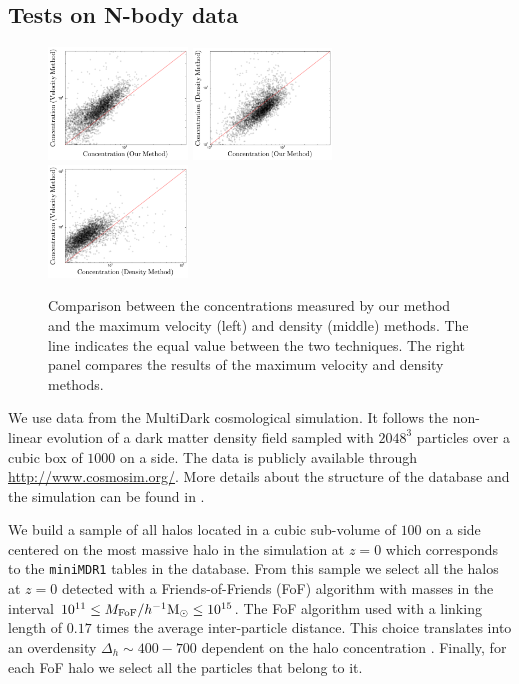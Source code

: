 \documentclass{emulateapj}
\newcommand{\hMpc}{{\ifmmode{h^{-1}{\rm Mpc}}\else{$h^{-1}$Mpc }\fi}}
\newcommand{\hMsun}{{\ifmmode{h^{-1}{\rm
        {M_{\odot}}}}\else{$h^{-1}{\rm{M_{\odot}}}$}\fi}}
\begin{document}
\subsection{Tests on N-body data}
\label{sec:data}
\begin{figure}
  \begin{center}
    \includegraphics[width=0.33\textwidth]{mass-velocity.pdf}
    \includegraphics[width=0.33\textwidth]{mass-density.pdf}
    \includegraphics[width=0.33\textwidth]{density-velocity.pdf}
  \end{center}
  \caption{Comparison between the concentrations measured by our
    method and the maximum velocity (left) and density (middle)
    methods. The line indicates the equal value between the two
    techniques. The right panel compares the results of the maximum
    velocity and density methods.
  \label{fig:mdv}}
\end{figure}

We use data from the MultiDark cosmological simulation.
It follows the non-linear evolution of a dark matter density field
sampled with $2048^3$ particles over a cubic box of $1000$ \hMpc on a side.
The data is publicly available through \url{http://www.cosmosim.org/}.
More details about the structure of the database and the simulation
can be found in \citep{2013AN....334..691R}.

We build a sample of all halos located in a cubic sub-volume of $100$
\hMpc on a side centered on the most massive halo in the simulation at
$z=0$ which corresponds to the \texttt{miniMDR1} tables in the
database.
From this sample we select all the halos at $z=0$ detected with a
Friends-of-Friends (FoF) algorithm with masses in the interval
$10^{11}\leq M_{\rm FoF}/\hMsun \leq 10^{15}$.
The FoF algorithm used with a linking length of $0.17$ times the average
inter-particle distance. This choice translates into an overdensity
$\Delta_h\sim 400-700$ dependent on the halo concentration
\citep{More2011}.
Finally, for each FoF halo we select all the particles that
belong to it.
\end{document}
